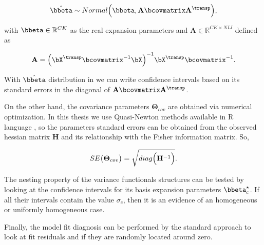 \begin{equation}
  \label{eq:betadist}
  \hat{\bbeta}
  \sim
  Normal
  \Bigl(
  \bbeta,
  \mathbf{A}
  \bcovmatrix
  \mathbf{A}^\transp
  \Bigr),
\end{equation}

\noindent with $\bbeta \in \mathbb{R}^{CK}$ as the real expansion parameters and $\mathbf{A} \in \mathbb{R}^{CK \times NIJ}$ defined as

\begin{equation}
  \label{eq:covbeta}
\mathbf{A} = \Bigl(
      \bX^\transp
      \bcovmatrix^{-1}
      \bX
      \Bigr)^{-1}
      \bX^\transp
      \bcovmatrix^{-1}.
\end{equation}

With $\hat{\bbeta}$ distribution in  we can write confidence intervals based on its standard errors in the diagonal of $  \mathbf{A}\bcovmatrix \mathbf{A}^\transp$.

On the other hand, the covariance parameters $\boldsymbol \Theta_{cov}$ are obtained via numerical optimization. In this thesis we use Quasi-Newton methods available in R language \cite{fletcher2013practical,rlang}, so the parameters standard errors can be obtained from the observed hessian matrix $\mathbf{H}$ and its relationship with the Fisher information matrix. So,

\begin{equation}
  \label{eq:secov}
  SE
  \bigl(
  \boldsymbol \Theta_{cov}
  \bigr)
  =
  \sqrt{diag
    \Bigl(
    \mathbf{H}^{-1}
  \Bigr)}.
\end{equation}

The nesting property of the variance functionals structures can be tested by looking at the confidence intervals for its basis expansion parameters $\bbeta_c^\star$. If all their intervals contain the value $\sigma_c$, then it is an evidence of an homogeneous or uniformly homogeneous case.

Finally, the model fit diagnosis can be performed by the standard approach to look at fit residuals and if they are randomly located around zero.
